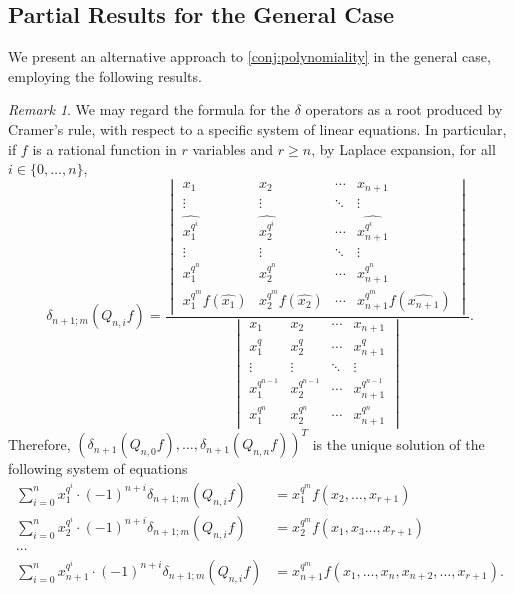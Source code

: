 \documentclass[12pt,a4paper]{report}
\theoremstyle{definition}
\theoremstyle{remark}
\newtheorem*{remark}{Remark}
\theoremstyle{definition}
\begin{document}
\subsection{Partial Results for the General Case}
We present an alternative approach to \cref{conj:polynomiality} in the general case, employing the following results.
\begin{remark}
    We may regard the formula for the $\delta$ operators as a root produced by Cramer's rule, with respect to a specific system of linear equations. In particular, if $f$ is a rational function in $r$ variables and $r\geq n$, by Laplace expansion, for all $i\in \{0,\ldots, n\}$,
    \begin{equation*}
        \delta_{n+1;m}(Q_{n,i}f) = \dfrac{\begin{vmatrix}
        x_1 & x_2 & \cdots & x_{n+1}\\
        \vdots & \vdots & \ddots & \vdots\\
        \widehat{x_1^{q^i}} & \widehat{x_2^{q^i}} & \cdots & \widehat{x_{n+1}^{q^i}}\\
        \vdots & \vdots & \ddots & \vdots\\
        x_1^{q^{n}} & x_2^{q^{n}} & \cdots & x_{n+1}^{q^{n}}\\
        x_1^{q^m}f(\widehat{x_1}) & x_2^{q^m}f(\widehat{x_2}) & \cdots & x_{n+1}^{q^m}f(\widehat{x_{n+1}})
    \end{vmatrix}}{\begin{vmatrix}
        x_1 & x_2 & \cdots & x_{n+1}\\
        x_1^{q} & x_2^{q} & \cdots & x_{n+1}^q\\
        \vdots & \vdots & \ddots & \vdots\\
        x_1^{q^{n-1}} & x_2^{q^{n-1}} & \cdots & x_{n+1}^{q^{n-1}}\\
        x_1^{q^n} & x_2^{q^n} & \cdots & x_{n+1}^{q^n}
    \end{vmatrix}}.
    \end{equation*}
    Therefore, $(\delta_{n+1}(Q_{n, 0}f), \ldots, \delta_{n+1}(Q_{n, n}f))^{T}$ is the unique solution of the following system of equations
    \begin{equation}\label{eq:sys_of_eqs}
        \begin{aligned}
         \sum\limits_{i=0}^{n} x_{1}^{q^i}\cdot (-1)^{n+i}\delta_{n+1;m}(Q_{n,i}f)&=x_{1}^{q^m}f(x_2, \ldots, x_{r+1}) \\
         \sum\limits_{i=0}^{n} x_{2}^{q^i}\cdot (-1)^{n+i}\delta_{n+1;m}(Q_{n,i}f)&=x_{2}^{q^m}f(x_1, x_3 \ldots, x_{r+1}) \\
         \cdots &\\
         \sum\limits_{i=0}^{n} x_{n+1}^{q^i}\cdot (-1)^{n+i}\delta_{n+1;m}(Q_{n,i}f)&=x_{n+1}^{q^m}f(x_1, \ldots, x_{n}, x_{n+2}, \ldots, x_{r+1}).
    \end{aligned}
    \end{equation}
\end{remark}
\end{document}
